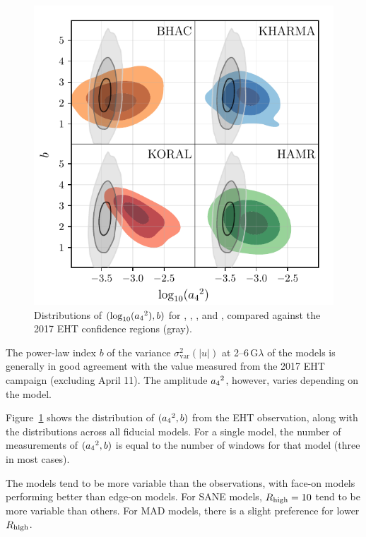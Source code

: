 \begin{figure}
  \centering
  \includegraphics[width=\columnwidth]{./figures/grmhd_triangle_debiased_combined.pdf}
  \caption{Distributions of $(\log_{10}({a_4}^2), b)$ for \bhac, \kharma, \koral, and \hamr, compared against the 2017 EHT confidence regions (gray).}
  \label{fig:cmp_VLBI_var}
\end{figure}

The power-law index $b$ of the variance $\sigma_\text{var}^2 (|u|)$ at 2--6\,G$\lambda$ of the models is generally in good agreement with the value measured  from the 2017 EHT campaign (excluding April 11).
The amplitude ${a_4}^2$, however, varies depending on the model.

Figure~\ref{fig:cmp_VLBI_var} shows the distribution of $({a_4}^2, b)$ from the EHT observation, along with the distributions across all fiducial models.
For a single model, the number of measurements of $({a_4}^2, b)$ is equal to the number of windows for that model (three in most cases).

The models tend to be more variable than the observations, with face-on models performing better than edge-on models.
For SANE models, $R_\mathrm{high} = 10$ tend to be more variable than others.
For MAD models, there is a slight preference for lower $R_\mathrm{high}$.


